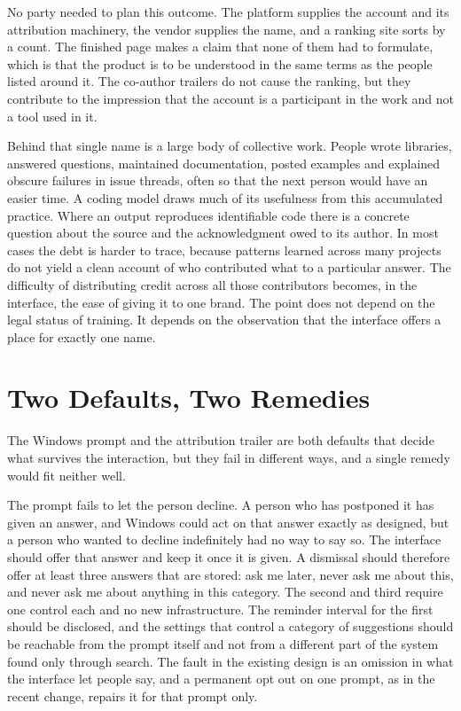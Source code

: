 \documentclass[11pt]{article}
\begin{document}
No party needed to plan this outcome. The platform supplies the account and its attribution machinery, the vendor supplies the name, and a ranking site sorts by a count. The finished page makes a claim that none of them had to formulate, which is that the product is to be understood in the same terms as the people listed around it. The co-author trailers do not cause the ranking, but they contribute to the impression that the account is a participant in the work and not a tool used in it.

Behind that single name is a large body of collective work. People wrote libraries, answered questions, maintained documentation, posted examples and explained obscure failures in issue threads, often so that the next person would have an easier time. A coding model draws much of its usefulness from this accumulated practice. Where an output reproduces identifiable code there is a concrete question about the source and the acknowledgment owed to its author. In most cases the debt is harder to trace, because patterns learned across many projects do not yield a clean account of who contributed what to a particular answer. The difficulty of distributing credit across all those contributors becomes, in the interface, the ease of giving it to one brand. The point does not depend on the legal status of training. It depends on the observation that the interface offers a place for exactly one name.

\section{Two Defaults, Two Remedies}

The Windows prompt and the attribution trailer are both defaults that decide what survives the interaction, but they fail in different ways, and a single remedy would fit neither well.

The prompt fails to let the person decline. A person who has postponed it has given an answer, and Windows could act on that answer exactly as designed, but a person who wanted to decline indefinitely had no way to say so. The interface should offer that answer and keep it once it is given. A dismissal should therefore offer at least three answers that are stored: ask me later, never ask me about this, and never ask me about anything in this category. The second and third require one control each and no new infrastructure. The reminder interval for the first should be disclosed, and the settings that control a category of suggestions should be reachable from the prompt itself and not from a different part of the system found only through search. The fault in the existing design is an omission in what the interface let people say, and a permanent opt out on one prompt, as in the recent change, repairs it for that prompt only.
\end{document}
